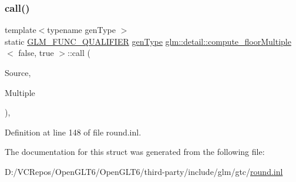 \subsubsection{\texorpdfstring{call()}{call()}}
{\footnotesize\ttfamily template$<$typename gen\+Type $>$ \\
static \mbox{\hyperlink{setup_8hpp_a33fdea6f91c5f834105f7415e2a64407}{G\+L\+M\+\_\+\+F\+U\+N\+C\+\_\+\+Q\+U\+A\+L\+I\+F\+I\+ER}} \mbox{\hyperlink{structglm_1_1detail_1_1gen_type}{gen\+Type}} \mbox{\hyperlink{structglm_1_1detail_1_1compute__floor_multiple}{glm\+::detail\+::compute\+\_\+floor\+Multiple}}$<$ false, true $>$\+::call (\begin{DoxyParamCaption}\item[{\mbox{\hyperlink{structglm_1_1detail_1_1gen_type}{gen\+Type}}}]{Source,  }\item[{\mbox{\hyperlink{structglm_1_1detail_1_1gen_type}{gen\+Type}}}]{Multiple }\end{DoxyParamCaption})\hspace{0.3cm}{\ttfamily [inline]}, {\ttfamily [static]}}



Definition at line 148 of file round.\+inl.



The documentation for this struct was generated from the following file\+:\begin{DoxyCompactItemize}
\item 
D\+:/\+V\+C\+Repos/\+Open\+G\+L\+T6/\+Open\+G\+L\+T6/third-\/party/include/glm/gtc/\mbox{\hyperlink{round_8inl}{round.\+inl}}\end{DoxyCompactItemize}

